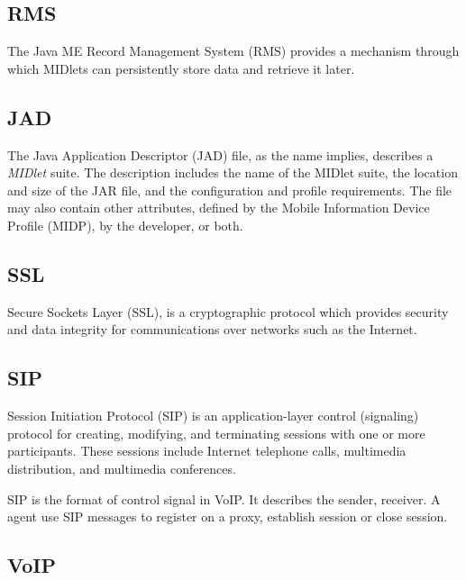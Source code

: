 \subsection*{RMS}
\label{sec:RMS}
\label{sym:RMS}
The Java ME Record Management System (RMS) provides a mechanism through which MIDlets can persistently store data and retrieve it later. \cite{J2MERecordManagementStore}

\subsection*{JAD}
\label{sec:JAD}
\label{sym:JAD}

The Java Application Descriptor (JAD) file, as the name implies, describes a \textit{MIDlet} suite. The description includes the name of the MIDlet suite, the location and size of the JAR file, and the configuration and profile requirements. The file may also contain other attributes, defined by the Mobile Information Device Profile (MIDP), by the developer, or both. \cite{LearningPathMIDletLifeCycle}


\subsection*{SSL}
\label{sec:SSL}
\label{sym:SSL}

Secure Sockets Layer (SSL), is a cryptographic protocol which provides security and data integrity for communications over networks such as the Internet. \cite{SSLAtWiKi}


\subsection*{SIP}
\label{sec:SIP}
\label{sym:SIP}

Session Initiation Protocol (SIP) is an application-layer control (signaling) protocol for creating, modifying, and terminating sessions with one or more participants. These sessions include Internet telephone calls, multimedia distribution, and multimedia conferences. \cite{RFC3261}

SIP is the format of control signal in VoIP. It describes the sender, receiver. A agent use SIP messages to register on a proxy, establish session or close session. 

\subsection*{VoIP}
\label{sec:VoIP}
\label{sym:VoIP}

